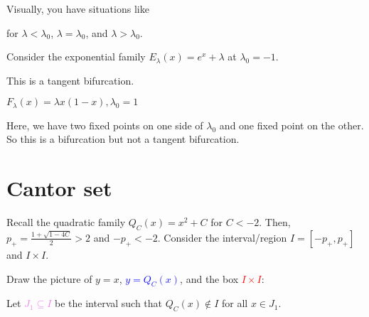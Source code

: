\documentclass[class=pmath370,tikz,notes]{agony}
\begin{document}
Visually, you have situations like
\begin{center}
  \quad
  \quad
\end{center}
for $\lambda<\lambda_0$, $\lambda = \lambda_0$, and $\lambda > \lambda_0$.

\begin{example}
  Consider the exponential family $E_\lambda(x) = e^x + \lambda$ at $\lambda_0=-1$.
\end{example}

This is a tangent bifurcation.

\begin{example}
  $F_\lambda(x) = \lambda x(1-x), \lambda_0 = 1$
\end{example}

Here, we have two fixed points on one side of $\lambda_0$
and one fixed point on the other.
So this is a bifurcation but not a tangent bifurcation.

\chapter{Cantor set}

Recall the quadratic family $Q_C(x) = x^2+C$ for $C < -2$.
Then, $p_+ = \frac{1+\sqrt{1-4C}}{2} > 2$ and $-p_+ < -2$.
Consider the interval/region $I = [-p_+,p_+]$ and $I\times I$.

Draw the picture of \textcolor{green!70!black}{$y=x$},
\textcolor{blue}{$y=Q_C(x)$}, and the box \textcolor{red}{$I \times I$}:
\begin{center}
\end{center}
Let \textcolor{violet}{$J_1 \subseteq I$} be the interval such that $Q_C(x) \not\in I$ for all $x \in J_1$.
\end{document}
